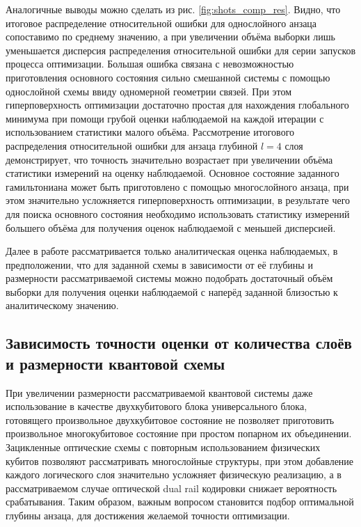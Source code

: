 \documentclass[14pt]{extarticle}
\begin{document}
\qquad Аналогичные выводы можно сделать из рис. \ref{fig:shots_comp_res}. Видно, что итоговое распределение относительной ошибки для однослойного анзаца сопоставимо по среднему значению, а при увеличении объёма выборки лишь уменьшается дисперсия распределения относительной ошибки для серии запусков процесса оптимизации. Большая ошибка связана с невозможностью приготовления основного состояния сильно смешанной системы с помощью однослойной схемы ввиду одномерной геометрии связей. При этом гиперповерхность оптимизации достаточно простая для нахождения глобального минимума при помощи грубой оценки наблюдаемой на каждой итерации с использованием статистики малого объёма. Рассмотрение итогового распределения относительной ошибки для анзаца глубиной $l = 4$ слоя демонстрирует, что точность значительно возрастает при увеличении объёма статистики измерений на оценку наблюдаемой. Основное состояние заданного гамильтониана может быть приготовлено с помощью многослойного анзаца, при этом значительно усложняется гиперповерхность оптимизации, в результате чего для поиска основного состояния необходимо использовать статистику измерений большего объёма для получения оценок наблюдаемой с меньшей дисперсией.

\qquad Далее в работе рассматривается только аналитическая оценка наблюдаемых, в предположении, что для заданной схемы в зависимости от её глубины и размерности рассматриваемой системы можно подобрать достаточный объём выборки для получения оценки наблюдаемой с наперёд заданной близостью к аналитическому значению.


\subsection[Зависимость точности оценки от количества слоёв и размерности квантовой схемы]{Зависимость точности оценки от количества \linebreak слоёв и размерности квантовой схемы}

\qquad При увеличении размерности рассматриваемой квантовой системы даже использование в качестве двухкубитового блока универсального блока, готовящего произвольное двухкубитовое состояние не позволяет приготовить произвольное многокубитовое состояние при простом попарном их объединении. Зацикленные оптические схемы с повторным использованием физических кубитов позволяют рассматривать многослойные структуры, при этом добавление каждого логического слоя значительно усложняет физическую реализацию, а в рассматриваемом случае оптической dual rail кодировки снижает вероятность срабатывания. Таким образом, важным вопросом становится подбор оптимальной глубины анзаца, для достижения желаемой точности оптимизации.
\end{document}
